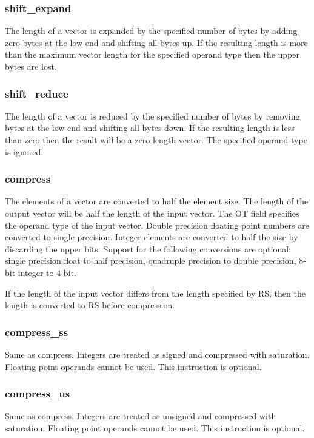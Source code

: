 \documentclass[forwardcom.tex]{subfiles}
\begin{document}
\subsubsection{shift\_expand}
The length of a vector is expanded by the specified number of bytes by adding zero-bytes at the low end and shifting all bytes up. If the resulting length is more than the maximum vector length for the specified operand type then the upper bytes are lost.

\subsubsection{shift\_reduce}
The length of a vector is reduced by the specified number of bytes by removing bytes at the low end and shifting all bytes down. If the resulting length is less than zero then the result will be a zero-length vector. The specified operand type is ignored.

\subsubsection{compress}
The elements of a vector are converted to half the element size. The length of the output vector will be half the length of the input vector. The OT field specifies the operand type of the input vector. Double precision floating point numbers are converted to single precision. Integer elements are converted to half the size by discarding the upper bits. Support for the following conversions are optional: single precision float to half precision, quadruple precision to double precision, 8-bit integer to 4-bit.
\vspace{2mm}

If the length of the input vector differs from the length specified by RS, then the length is converted to RS before compression.

\subsubsection{compress\_ss}
Same as compress. Integers are treated as signed and compressed with saturation. Floating point operands cannot be used. This instruction is optional.

\subsubsection{compress\_us}
Same as compress. Integers are treated as unsigned and compressed with saturation. Floating point operands cannot be used. This instruction is optional.
\end{document}
